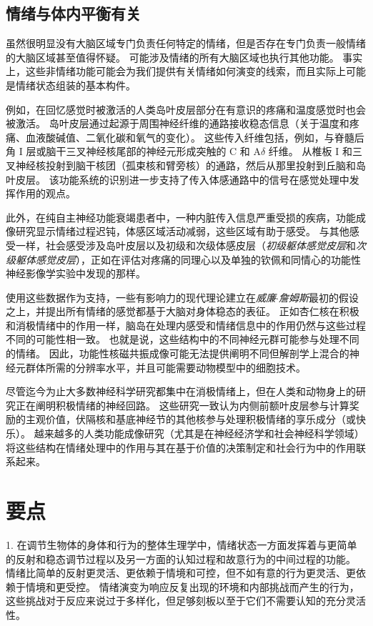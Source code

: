 \subsection{情绪与体内平衡有关}

虽然很明显没有大脑区域专门负责任何特定的情绪，但是否存在专门负责一般情绪的大脑区域甚至值得怀疑。
可能涉及情绪的所有大脑区域也执行其他功能。
事实上，这些非情绪功能可能会为我们提供有关情绪如何演变的线索，而且实际上可能是情绪状态组装的基本构件。


例如，在回忆感觉时被激活的人类岛叶皮层部分在有意识的疼痛和温度感觉时也会被激活。
岛叶皮层通过起源于周围神经纤维的通路接收稳态信息（关于温度和疼痛、血液酸碱值、二氧化碳和氧气的变化）。
这些传入纤维包括，例如，与脊髓后角 I 层或脑干三叉神经核尾部的神经元形成突触的 C 和 A$ \delta $ 纤维。
从椎板 I 和三叉神经核投射到脑干核团（孤束核和臂旁核）的通路，然后从那里投射到丘脑和岛叶皮层。
该功能系统的识别进一步支持了传入体感通路中的信号在感觉处理中发挥作用的观点。


此外，在纯自主神经功能衰竭患者中，一种内脏传入信息严重受损的疾病，功能成像研究显示情绪过程迟钝，体感区域活动减弱，这些区域有助于感受。
与其他感受一样，社会感受涉及岛叶皮层以及初级和次级体感皮层（\textit{初级躯体感觉皮层}和\textit{次级躯体感觉皮层}），正如在评估对疼痛的同理心以及单独的钦佩和同情心的功能性神经影像学实验中发现的那样。


使用这些数据作为支持，一些有影响力的现代理论建立在\textit{威廉$\cdot$詹姆斯}最初的假设之上，并提出所有情绪的感觉都基于大脑对身体稳态的表征。
正如杏仁核在积极和消极情绪中的作用一样，脑岛在处理内感受和情绪信息中的作用仍然与这些过程不同的可能性相一致。
也就是说，这些结构中的不同神经元群可能参与处理不同的情绪。
因此，功能性核磁共振成像可能无法提供阐明不同但解剖学上混合的神经元群体所需的分辨率水平，并且可能需要动物模型中的细胞技术。


尽管迄今为止大多数神经科学研究都集中在消极情绪上，但在人类和动物身上的研究正在阐明积极情绪的神经回路。
这些研究一致认为内侧前额叶皮层参与计算奖励的主观价值，伏隔核和基底神经节的其他核参与处理积极情绪的享乐成分（或快乐）。
越来越多的人类功能成像研究（尤其是在神经经济学和社会神经科学领域）将这些结构在情绪处理中的作用与其在基于价值的决策制定和社会行为中的作用联系起来。



\section{要点}

1. 在调节生物体的身体和行为的整体生理学中，情绪状态一方面发挥着与更简单的反射和稳态调节过程以及另一方面的认知过程和故意行为的中间过程的功能。
情绪比简单的反射更灵活、更依赖于情境和可控，但不如有意的行为更灵活、更依赖于情境和更受控。
情绪演变为响应反复出现的环境和内部挑战而产生的行为，这些挑战对于反应来说过于多样化，但足够刻板以至于它们不需要认知的充分灵活性。


